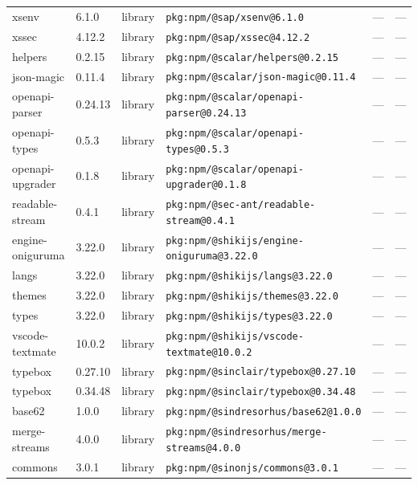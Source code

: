 \documentclass[11pt,a4paper]{article}
\begin{document}
\begin{longtable}{|p{4cm}|p{2cm}|p{1.6cm}|p{5cm}|p{1.5cm}|p{3.5cm}|}
\raggedright xsenv & 6.1.0 & library & \small\texttt{pkg:npm/@sap/xsenv@6.1.0} & — & \small — \\
\raggedright xssec & 4.12.2 & library & \small\texttt{pkg:npm/@sap/xssec@4.12.2} & — & \small — \\
\raggedright helpers & 0.2.15 & library & \small\texttt{pkg:npm/@scalar/helpers@0.2.15} & — & \small — \\
\raggedright json-magic & 0.11.4 & library & \small\texttt{pkg:npm/@scalar/json-magic@0.11.4} & — & \small — \\
\raggedright openapi-parser & 0.24.13 & library & \small\texttt{pkg:npm/@scalar/openapi-parser@0.24.13} & — & \small — \\
\raggedright openapi-types & 0.5.3 & library & \small\texttt{pkg:npm/@scalar/openapi-types@0.5.3} & — & \small — \\
\raggedright openapi-upgrader & 0.1.8 & library & \small\texttt{pkg:npm/@scalar/openapi-upgrader@0.1.8} & — & \small — \\
\raggedright readable-stream & 0.4.1 & library & \small\texttt{pkg:npm/@sec-ant/readable-stream@0.4.1} & — & \small — \\
\raggedright engine-oniguruma & 3.22.0 & library & \small\texttt{pkg:npm/@shikijs/engine-oniguruma@3.22.0} & — & \small — \\
\raggedright langs & 3.22.0 & library & \small\texttt{pkg:npm/@shikijs/langs@3.22.0} & — & \small — \\
\raggedright themes & 3.22.0 & library & \small\texttt{pkg:npm/@shikijs/themes@3.22.0} & — & \small — \\
\raggedright types & 3.22.0 & library & \small\texttt{pkg:npm/@shikijs/types@3.22.0} & — & \small — \\
\raggedright vscode-textmate & 10.0.2 & library & \small\texttt{pkg:npm/@shikijs/vscode-textmate@10.0.2} & — & \small — \\
\raggedright typebox & 0.27.10 & library & \small\texttt{pkg:npm/@sinclair/typebox@0.27.10} & — & \small — \\
\raggedright typebox & 0.34.48 & library & \small\texttt{pkg:npm/@sinclair/typebox@0.34.48} & — & \small — \\
\raggedright base62 & 1.0.0 & library & \small\texttt{pkg:npm/@sindresorhus/base62@1.0.0} & — & \small — \\
\raggedright merge-streams & 4.0.0 & library & \small\texttt{pkg:npm/@sindresorhus/merge-streams@4.0.0} & — & \small — \\
\raggedright commons & 3.0.1 & library & \small\texttt{pkg:npm/@sinonjs/commons@3.0.1} & — & \small — \\

\end{longtable}
\end{document}
